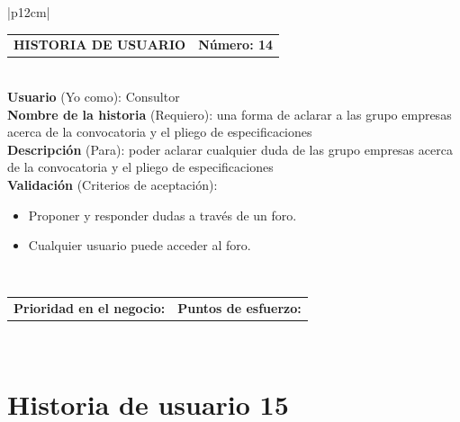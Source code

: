 \documentclass[11pt,letterpaper]{report}
\begin{document}
	\begin{center}	
		\begin{tabular}{|p{12cm}|}
			\hline
			\begin{tabular}{c|c}
				\textbf{HISTORIA DE USUARIO} & \textbf{Número: 14} \\
			\end{tabular} \\ \hline
			\textbf{Usuario} (Yo como): Consultor \\ \hline
			\textbf{Nombre de la historia} (Requiero): una forma de aclarar a las grupo empresas acerca de la convocatoria y el pliego de especificaciones \\ \hline
			\textbf{Descripción} (Para): poder aclarar cualquier duda de las grupo empresas acerca de la convocatoria y el pliego de especificaciones \\ \hline
			\textbf{Validación} (Criterios de aceptación): \\
			\begin{minipage}{12cm}
				\begin{itemize}
					\item Proponer y responder dudas a través de un foro.
					\item Cualquier usuario puede acceder al foro.
				\end{itemize}
			\end{minipage} \\ \hline
			\begin{tabular}{c|c}
				\textbf{Prioridad en el negocio: } & \textbf{Puntos de esfuerzo: } \\
			\end{tabular} \\ \hline
		\end{tabular}
	\end{center}
	
	\section{Historia de usuario 15}
	
\end{document}

